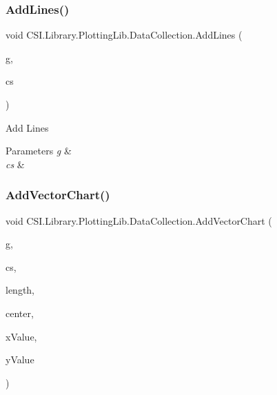 \subsubsection{\texorpdfstring{AddLines()}{AddLines()}}
{\footnotesize\ttfamily void C\+S\+I.\+Library.\+Plotting\+Lib.\+Data\+Collection.\+Add\+Lines (\begin{DoxyParamCaption}\item[{Graphics}]{g,  }\item[{\mbox{\hyperlink{class_c_s_i_1_1_library_1_1_plotting_lib_1_1_chart_style}{Chart\+Style}}}]{cs }\end{DoxyParamCaption})\hspace{0.3cm}{\ttfamily [inline]}}



Add Lines 


\begin{DoxyParams}{Parameters}
{\em g} & \\
\hline
{\em cs} & \\
\hline
\end{DoxyParams}
\mbox{\label{class_c_s_i_1_1_library_1_1_plotting_lib_1_1_data_collection_a9e07b370a4d5442883ddbaf6c05a67ef}} 
\subsubsection{\texorpdfstring{AddVectorChart()}{AddVectorChart()}}
{\footnotesize\ttfamily void C\+S\+I.\+Library.\+Plotting\+Lib.\+Data\+Collection.\+Add\+Vector\+Chart (\begin{DoxyParamCaption}\item[{Graphics}]{g,  }\item[{\mbox{\hyperlink{class_c_s_i_1_1_library_1_1_plotting_lib_1_1_chart_style}{Chart\+Style}}}]{cs,  }\item[{float}]{length,  }\item[{PointF}]{center,  }\item[{float}]{x\+Value,  }\item[{float}]{y\+Value }\end{DoxyParamCaption})\hspace{0.3cm}{\ttfamily [inline]}}



